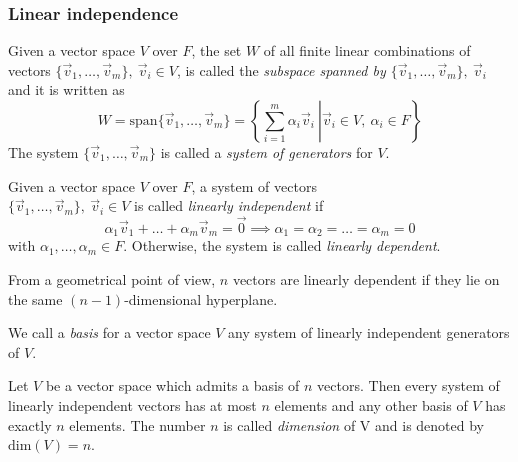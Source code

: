



\subsubsection{Linear independence}

\begin{definition}
    Given a vector space $V$ over $F$, the set $W$ of all finite linear combinations of vectors $\{\vec{v}_1, \hdots, \vec{v}_m\},\ \vec{v}_i \in V$, is called the \textit{subspace spanned by  $\{\vec{v}_1, \hdots, \vec{v}_m\},\ \vec{v}_i$}  and it is written as
    $$ W = \text{span}\{\vec{v}_1, \hdots, \vec{v}_m\} = \left\{ \left.\sum_{i=1}^{m}{\alpha_i\vec{v}_i} \ \right\vert \vec{v}_i \in V,\ \alpha_i \in F \right\} $$
    The system $\{\vec{v}_1, \hdots, \vec{v}_m\}$ is called a \textit{system of generators} for $V$.
\end{definition}



\begin{definition}
    Given a vector space $V$ over $F$, a system of vectors\\ $\{\vec{v}_1, \hdots, \vec{v}_m\},\ \vec{v}_i \in V$ is called \textit{linearly independent} if
    $$ \alpha_1\vec{v}_1 + \hdots + \alpha_m\vec{v}_m = \vec{0} \implies \alpha_1 = \alpha_2 = \hdots = \alpha_m = 0 $$
    with $\alpha_1, \hdots, \alpha_m \in F$. Otherwise, the system is called \textit{linearly dependent}.
\end{definition}

From a geometrical point of view, $n$ vectors are linearly dependent if they lie on the same $(n-1)$-dimensional hyperplane.



\begin{definition}
    We call a \textit{basis} for a vector space $V$ any system of linearly independent generators of $V$.
\end{definition}



\begin{proposition}
    Let $V$ be a vector space which admits a basis of $n$ vectors. Then every system of linearly independent vectors has at most $n$ elements and any other basis of $V$ has exactly $n$ elements. The number $n$ is called \textit{dimension} of V and is denoted by $\text{dim}(V) = n$.
\end{proposition}

